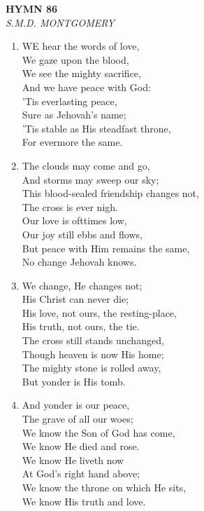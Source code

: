 \newpage
\begin{center}
    {\Large \textbf{HYMN 86}}
    \\
    \textit{S.M.D. MONTGOMERY}
\end{center}
\vspace{1em}

\begin{enumerate}
    \item WE hear the words of love, \\
        We gaze upon the blood, \\
        We see the mighty sacrifice, \\
        And we have peace with God: \\
        'Tis everlasting peace, \\
        Sure as Jehovah's name; \\
        'Tis stable as His steadfast throne, \\
        For evermore the same.

    \item The clouds may come and go, \\
        And storms may sweep our sky; \\
        This blood-sealed friendship changes not, \\
        The cross is ever nigh. \\
        Our love is ofttimes low, \\
        Our joy still ebbs and flows, \\
        But peace with Him remains the same, \\
        No change Jehovah knows.

    \item We change, He changes not; \\
        His Christ can never die; \\
        His love, not ours, the resting-place, \\
        His truth, not ours, the tie. \\
        The cross still stands unchanged, \\
        Though heaven is now His home; \\
        The mighty stone is rolled away, \\
        But yonder is His tomb.

    \item And yonder is our peace, \\
        The grave of all our woes; \\
        We know the Son of God has come, \\
        We know He died and rose. \\
        We know He liveth now \\
        At God's right hand above; \\
        We know the throne on which He sits, \\
        We know His truth and love.

\end{enumerate}

